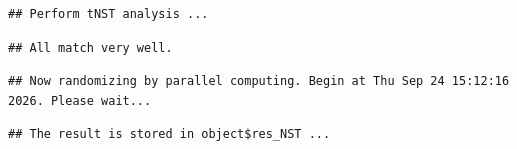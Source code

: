 \documentclass[
]{book}
\newenvironment{Shaded}{\begin{snugshade}}{\end{snugshade}}
\newcommand{\AttributeTok}[1]{\textcolor[rgb]{0.13,0.29,0.53}{#1}}
\newcommand{\CommentTok}[1]{\textcolor[rgb]{0.56,0.35,0.01}{\textit{#1}}}
\newcommand{\ConstantTok}[1]{\textcolor[rgb]{0.56,0.35,0.01}{#1}}
\newcommand{\FunctionTok}[1]{\textcolor[rgb]{0.13,0.29,0.53}{\textbf{#1}}}
\newcommand{\NormalTok}[1]{#1}
\newcommand{\SpecialCharTok}[1]{\textcolor[rgb]{0.81,0.36,0.00}{\textbf{#1}}}
\newcommand{\StringTok}[1]{\textcolor[rgb]{0.31,0.60,0.02}{#1}}
\begin{document}
\begin{Shaded}
\end{Shaded}

\begin{verbatim}
## Perform tNST analysis ...
\end{verbatim}

\begin{verbatim}
## All match very well.
\end{verbatim}

\begin{verbatim}
## Now randomizing by parallel computing. Begin at Thu Sep 24 15:12:16 2026. Please wait...
\end{verbatim}

\begin{verbatim}
## The result is stored in object$res_NST ...
\end{verbatim}
\end{document}
